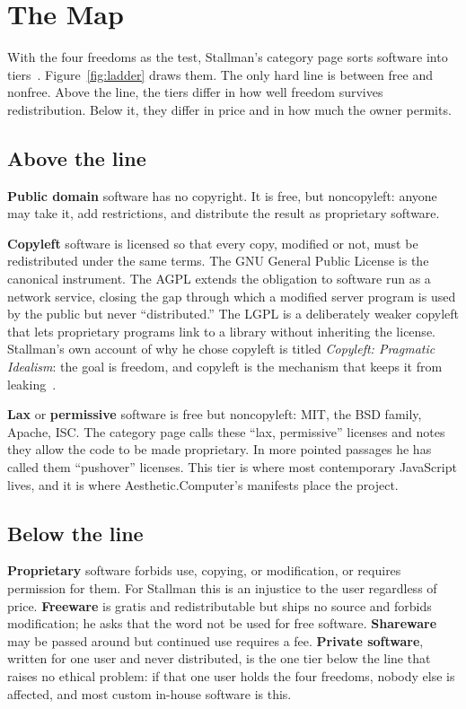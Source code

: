 \documentclass[10pt,letterpaper,twocolumn]{article}
\newcommand{\acdot}{{\color{acpink}.}}
\newcommand{\ac}{Aesthetic{\acdot}Computer}
\newcommand{\term}[1]{``#1''}
\begin{document}
\section{The Map}

With the four freedoms as the test, Stallman's category page sorts software into tiers~\citep{stallman_categories}. Figure~\ref{fig:ladder} draws them. The only hard line is between free and nonfree. Above the line, the tiers differ in how well freedom survives redistribution. Below it, they differ in price and in how much the owner permits.

\subsection{Above the line}

\textbf{Public domain} software has no copyright. It is free, but noncopyleft: anyone may take it, add restrictions, and distribute the result as proprietary software.

\textbf{Copyleft} software is licensed so that every copy, modified or not, must be redistributed under the same terms. The GNU General Public License is the canonical instrument. The AGPL extends the obligation to software run as a network service, closing the gap through which a modified server program is used by the public but never \term{distributed.} The LGPL is a deliberately weaker copyleft that lets proprietary programs link to a library without inheriting the license. Stallman's own account of why he chose copyleft is titled \emph{Copyleft: Pragmatic Idealism}: the goal is freedom, and copyleft is the mechanism that keeps it from leaking~\citep{stallman_pragmatic}.

\textbf{Lax} or \textbf{permissive} software is free but noncopyleft: MIT, the BSD family, Apache, ISC. The category page calls these \term{lax, permissive} licenses and notes they allow the code to be made proprietary. In more pointed passages he has called them \term{pushover} licenses. This tier is where most contemporary JavaScript lives, and it is where \ac{}'s manifests place the project.

\subsection{Below the line}

\textbf{Proprietary} software forbids use, copying, or modification, or requires permission for them. For Stallman this is an injustice to the user regardless of price. \textbf{Freeware} is gratis and redistributable but ships no source and forbids modification; he asks that the word not be used for free software. \textbf{Shareware} may be passed around but continued use requires a fee. \textbf{Private software}, written for one user and never distributed, is the one tier below the line that raises no ethical problem: if that one user holds the four freedoms, nobody else is affected, and most custom in-house software is this.
\end{document}
